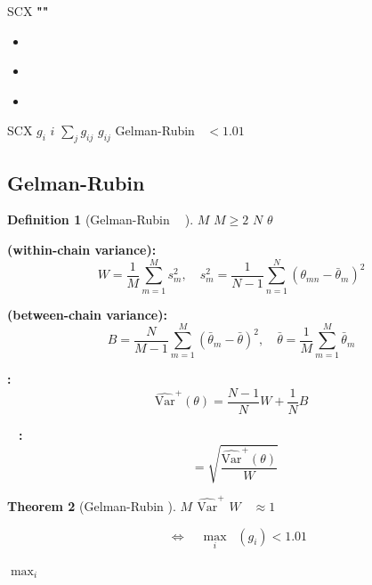 \documentclass[12pt,a4paper]{article}
\theoremstyle{plain}
\newtheorem{theorem}{ Theorem}[section]
\theoremstyle{definition}
\newtheorem{definition}[theorem]{ Definition}
\newcommand{\Var}{\mathrm{Var}}
\DeclareMathOperator{\Rhat}{\hat{R}}
\begin{document}
SCX \textbf{""
} 

\begin{itemize}
    \item \textbf{} 
    \item \textbf{} 
    \item \textbf{} 
\end{itemize}

\textbf{}  SCX \textbf{}
$g_i$ $i$  $\sum_j g_{ij}$ $g_{ij}$ 
Gelman-Rubin  $\Rhat < 1.01$

\subsection{Gelman-Rubin }

\begin{definition}[Gelman-Rubin $\Rhat$ ]
 $M$ $M \geq 2$ $N$  $\theta$


\vspace{4pt}
\noindent\textbf{ (within-chain variance):}
\begin{equation}\label{eq:W}
    W = \frac{1}{M} \sum_{m=1}^M s_m^2,\quad
    s_m^2 = \frac{1}{N-1} \sum_{n=1}^N (\theta_{mn} - \bar{\theta}_m)^2
\end{equation}

\noindent\textbf{ (between-chain variance):}
\begin{equation}\label{eq:B}
    B = \frac{N}{M-1} \sum_{m=1}^M (\bar{\theta}_m - \bar{\theta})^2,\quad
    \bar{\theta} = \frac{1}{M} \sum_{m=1}^M \bar{\theta}_m
\end{equation}

\noindent\textbf{:}
\begin{equation}\label{eq:var_plus}
    \widehat{\Var}^+(\theta) = \frac{N-1}{N} W + \frac{1}{N} B
\end{equation}

\noindent\textbf{$\Rhat$ :}
\begin{equation}\label{eq:Rhat}
    \Rhat = \sqrt{\frac{\widehat{\Var}^+(\theta)}{W}}
\end{equation}
\end{definition}

\begin{theorem}[Gelman-Rubin ]
\label{thm:rhat_criterion}
 $M$  $\widehat{\Var}^+$  $W$ 
$\Rhat \approx 1$

\begin{equation}\label{eq:audit_converged}
    \text{} \quad \Longleftrightarrow \quad
    \max_{i} \Rhat(g_i) < 1.01
\end{equation}

 $\max_{i}$ 
\end{theorem}
\end{document}
